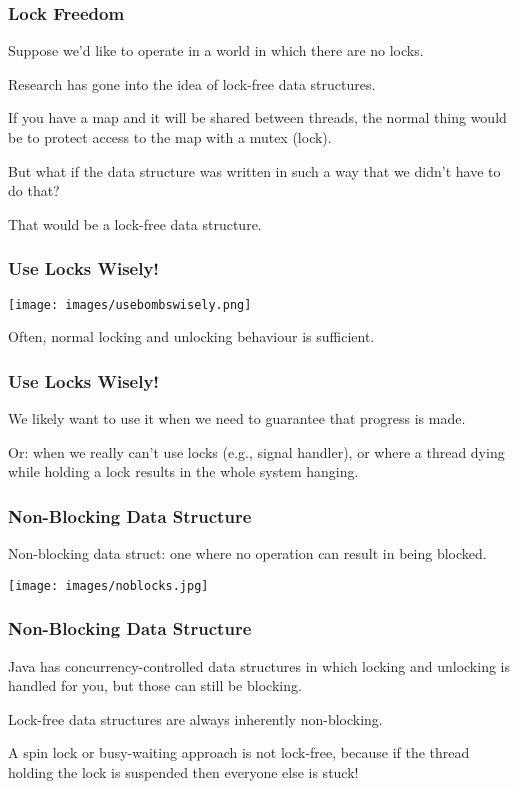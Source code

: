 \begin{frame}
\frametitle{Lock Freedom}

Suppose we'd like to operate in a world in which there are no locks. 

Research has gone into the idea of lock-free data structures. 

If you have a map and it will be shared between threads, the normal thing would be to protect access to the map with a mutex (lock). 

But what if the data structure was written in such a way that we didn't have to do that? 

That would be a lock-free data structure.

\end{frame}

\begin{frame}
\frametitle{Use Locks Wisely!}

\begin{center}
	\texttt{[image: images/usebombswisely.png]}
\end{center}

Often, normal locking and unlocking behaviour is sufficient.

\end{frame}

\begin{frame}
\frametitle{Use Locks Wisely!}


We likely want to use it when we need to guarantee that progress is made. 

Or: when we really can't use locks (e.g., signal handler), or where a thread dying while holding a lock results in the whole system hanging.

\end{frame}

\begin{frame}
\frametitle{Non-Blocking Data Structure}

Non-blocking data struct: one where no operation can result in being blocked. 


\begin{center}
	\texttt{[image: images/noblocks.jpg]}
\end{center}


\end{frame}

\begin{frame}
\frametitle{Non-Blocking Data Structure}

Java has concurrency-controlled data structures in which locking and unlocking is handled for you, but those can still be blocking. 

Lock-free data structures are always inherently non-blocking. 

A spin lock or busy-waiting approach is not lock-free, because if the thread holding the lock is suspended then everyone else is stuck!

\end{frame}

